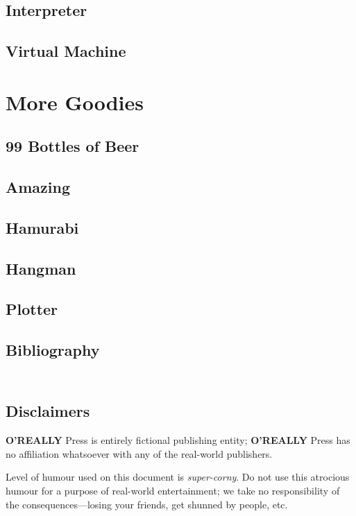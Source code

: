 \documentclass[10pt, stock, openany, chapter]{memoir}
\newcommand{\oreallypress}{\begingroup\hspace{0.083em}\large\textbf{O'REALLY\raisebox{1ex}{\scriptsize ?}} \large Press\endgroup}
\begin{document}
\chapter{Interpreter}


\chapter{Virtual Machine}


\part{More Goodies}

\chapter{99 Bottles of Beer}


\chapter{Amazing}


\chapter{Hamurabi}


\chapter{Hangman}


\chapter{Plotter}


\chapter{Bibliography}


{
\let\clearpage\relax
\chapter*{\ \\ Disclaimers}

\oreallypress{} is entirely fictional publishing entity; \oreallypress{} has no affiliation whatsoever with any of the real-world publishers.

Level of humour used on this document is \emph{super-corny}. Do not use this atrocious humour for a purpose of real-world entertainment; we take no responsibility of the consequences---losing your friends, get shunned by people, etc.
}
\end{document}
